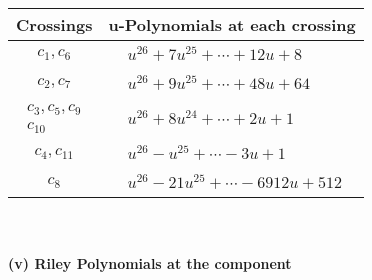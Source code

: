 \documentclass[1p]{elsarticle_modified}
\theoremstyle{definition}
\begin{document}
\begin{tabular}{m{50pt}|m{274pt}}
Crossings & \hspace{64pt}u-Polynomials at each crossing \\
\hline $$\begin{aligned}c_{1},c_{6}\end{aligned}$$&$\begin{aligned}
&u^{26}+7 u^{25}+\cdots+12 u+8
\end{aligned}$\\
\hline $$\begin{aligned}c_{2},c_{7}\end{aligned}$$&$\begin{aligned}
&u^{26}+9 u^{25}+\cdots+48 u+64
\end{aligned}$\\
\hline $$\begin{aligned}c_{3},c_{5},c_{9}\\c_{10}\end{aligned}$$&$\begin{aligned}
&u^{26}+8 u^{24}+\cdots+2 u+1
\end{aligned}$\\
\hline $$\begin{aligned}c_{4},c_{11}\end{aligned}$$&$\begin{aligned}
&u^{26}- u^{25}+\cdots-3 u+1
\end{aligned}$\\
\hline $$\begin{aligned}c_{8}\end{aligned}$$&$\begin{aligned}
&u^{26}-21 u^{25}+\cdots-6912 u+512
\end{aligned}$\\
\hline
\end{tabular}\\~\\
\newpage\renewcommand{\arraystretch}{1}
\flushleft \textbf{(v) Riley Polynomials at the component}\newline \\
\end{document}
